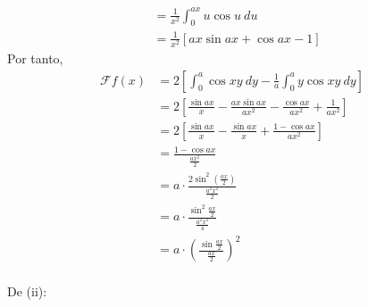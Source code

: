 \documentclass[12pt]{report}
\theoremstyle{largebreak}
\newcommand{\fou}[1]{\ensuremath{\mathcal{F}#1}}
\begin{document}
\begin{sol}
\begin{equation*}
\begin{split}
                &=\frac{1}{x^2}\int_0^{ax}u\cos u\:du\\
                &=\frac{1}{x^2}\left[ax\sin ax+\cos ax-1\right]
            \end{split}
        \end{equation*}
        Por tanto,
        \begin{equation*}
            \begin{split}
                \fou{f}(x)&=2\left[\int_{0}^a\cos xy\:dy-\frac{1}{a}\int_0^a y\cos xy\:dy\right]\\
                &=2\left[\frac{\sin ax}{x}-\frac{ax\sin ax}{ax^2}-\frac{\cos ax}{ax^2}+\frac{1}{ax^2}\right]\\
                &=2\left[\frac{\sin ax}{x}-\frac{\sin ax}{x}+\frac{1-\cos ax}{ax^2}\right]\\
                &=\frac{1-\cos ax}{\frac{ax^2}{2}}\\
                &=a\cdot\frac{2\sin^2\left(\frac{ax}{2}\right)}{\frac{a^2x^2}{2}}\\
                &=a\cdot\frac{\sin^2\frac{ax}{2}}{\frac{a^2x^2}{4}}\\
                &=a\cdot\left(\frac{\sin\frac{ax}{2}}{\frac{ax}{2}}\right)^2\\
            \end{split}
        \end{equation*}
        
        De (ii): 

    \end{sol}
\end{document}
